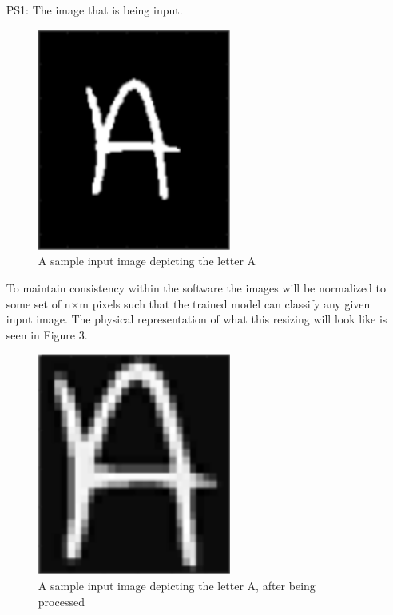\documentclass[12pt]{article}
\begin{document}
\begin{itemize}

\item[PS1:] The image that is being input.

\begin{figure}[h!]
  \begin{center}
   \includegraphics[width=0.6\textwidth]{physicalsystempreprocessing}
  \caption{A sample input image depicting the letter A}
  \label{Fig_PSPreproccessing} 
  \end{center}
  \end{figure}

  To maintain consistency within the software the images will be normalized to some set of n$\times$m pixels such that
  the trained model can classify any given input image. The physical representation of what this resizing will look like
  is seen in Figure 3.

  \begin{figure}[h!]
    \begin{center}
     \includegraphics[width=0.6\textwidth]{physicalsystem}
    \caption{A sample input image depicting the letter A, after being processed}
    \label{Fig_PS} 
    \end{center}
    \end{figure}


\end{itemize}
\end{document}
